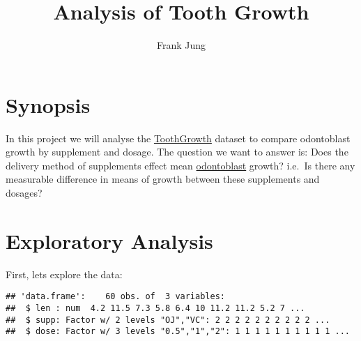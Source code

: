 \documentclass[legalpaper]{article}
\title{Analysis of Tooth Growth}
\author{Frank Jung}
\date{}
\newenvironment{Shaded}{\begin{snugshade}}{\end{snugshade}}
\newcommand{\KeywordTok}[1]{\textcolor[rgb]{0.13,0.29,0.53}{\textbf{{#1}}}}
\newcommand{\StringTok}[1]{\textcolor[rgb]{0.31,0.60,0.02}{{#1}}}
\newcommand{\CommentTok}[1]{\textcolor[rgb]{0.56,0.35,0.01}{\textit{{#1}}}}
\newcommand{\NormalTok}[1]{{#1}}
\begin{document}
\maketitle


{
\hypersetup{linkcolor=black}
\setcounter{tocdepth}{2}
\tableofcontents
}
\section{Synopsis}\label{synopsis}

In this project we will analyse the
\href{https://stat.ethz.ch/R-manual/R-devel/library/datasets/html/ToothGrowth.html}{ToothGrowth}
dataset to compare odontoblast growth by supplement and dosage. The
question we want to answer is: Does the delivery method of supplements
effect mean
\href{https://en.wikipedia.org/wiki/Odontoblast}{odontoblast} growth?
i.e.~Is there any measurable difference in means of growth between these
supplements and dosages?

\section{Exploratory Analysis}\label{exploratory-analysis}

First, lets explore the data:

\begin{Shaded}
\end{Shaded}

\begin{verbatim}
## 'data.frame':    60 obs. of  3 variables:
##  $ len : num  4.2 11.5 7.3 5.8 6.4 10 11.2 11.2 5.2 7 ...
##  $ supp: Factor w/ 2 levels "OJ","VC": 2 2 2 2 2 2 2 2 2 2 ...
##  $ dose: Factor w/ 3 levels "0.5","1","2": 1 1 1 1 1 1 1 1 1 1 ...
\end{verbatim}

\begin{Shaded}
\end{Shaded}
\end{document}
